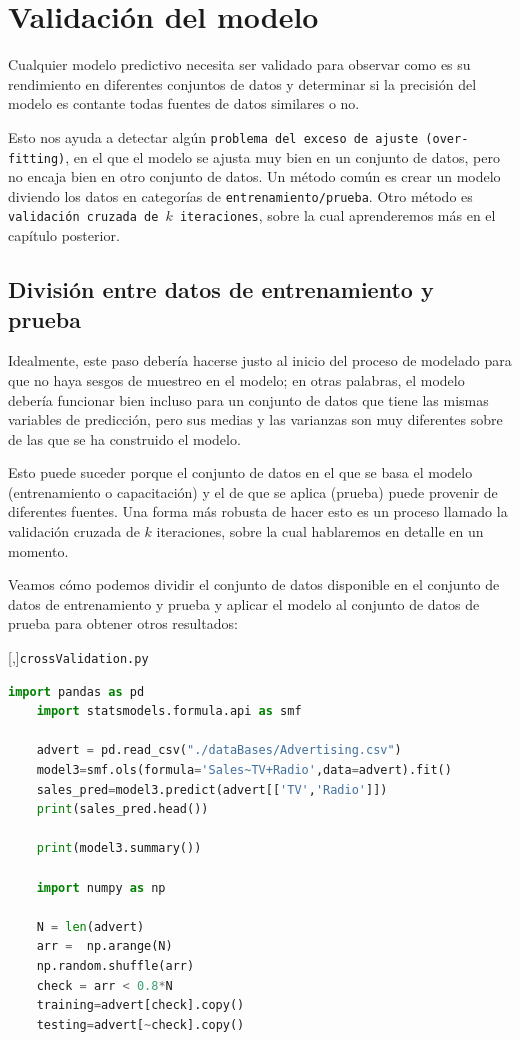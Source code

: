 \section{Validación del modelo}

Cualquier modelo predictivo necesita ser validado para observar como es su rendimiento en diferentes conjuntos de datos  y determinar si la precisión del modelo es contante todas fuentes de datos similares o no.


Esto nos ayuda a detectar algún \texttt{problema del exceso de ajuste (over-fitting)}, en el que el modelo se ajusta
muy bien en un conjunto de datos, pero no encaja bien en otro conjunto de datos. Un método común es crear un modelo diviendo los datos en categorías de \texttt{entrenamiento/prueba}. Otro método es
\texttt{validación cruzada de $k$ iteraciones}, sobre la cual aprenderemos más en el capítulo posterior.

\subsection{División entre datos de entrenamiento y prueba}

Idealmente, este paso debería hacerse justo al inicio del proceso de modelado para que
no haya sesgos de muestreo en el modelo; en otras palabras, el modelo debería funcionar
bien incluso para un conjunto de datos que tiene las mismas variables de predicción, pero sus medias y
las varianzas son muy diferentes sobre de las que se ha construido el modelo.


Esto puede
suceder porque el conjunto de datos en el que se basa el modelo (entrenamiento o capacitación) y el de
que se aplica (prueba) puede provenir de diferentes fuentes. Una forma más robusta de
hacer esto es un proceso llamado la validación cruzada de $k$ iteraciones, sobre la cual hablaremos en
detalle en un momento.


Veamos cómo podemos dividir el conjunto de datos disponible en el conjunto de datos de entrenamiento y prueba
y aplicar el modelo al conjunto de datos de prueba para obtener otros resultados:

[,]{\texttt{crossValidation.py}}
\begin{lstlisting}[language=Python]
	import pandas as pd
	import statsmodels.formula.api as smf
	
	advert = pd.read_csv("./dataBases/Advertising.csv")
	model3=smf.ols(formula='Sales~TV+Radio',data=advert).fit()
	sales_pred=model3.predict(advert[['TV','Radio']])
	print(sales_pred.head())
	
	print(model3.summary())
	
	import numpy as np
	
	N = len(advert)
	arr =  np.arange(N)
	np.random.shuffle(arr)
	check = arr < 0.8*N
	training=advert[check].copy()
	testing=advert[~check].copy()
\end{lstlisting}


